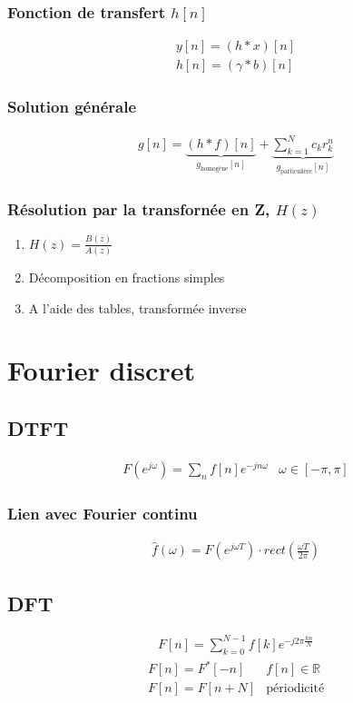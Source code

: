 \documentclass[a4paper]{amsart}
\begin{document}
\subsubsection{Fonction de transfert $h[n]$}
\begin{eqnarray}
	y[n]=(h*x)[n]\\
	h[n]=(\gamma*b)[n]
\end{eqnarray}
\subsubsection{Solution générale}
\begin{eqnarray}
	g[n]=\underbrace{(h*f)[n]}_{g_{\text{homogène}}[n]}+\underbrace{\sum_{k=1}^Nc_kr_k^n}_{g_{\text{particulière}}[n]}
\end{eqnarray}
\subsubsection{Résolution par la transfornée en Z, $H(z)$}
\begin{enumerate}
	\item $H(z)=\frac{B(z)}{A(z)}$
	\item Décomposition en fractions simples
	\item A l'aide des tables, transformée inverse
\end{enumerate}

\section{Fourier discret}
\subsection{DTFT}
\begin{eqnarray}
	F(e^{j\omega})=\sum_n f[n]e^{-jn\omega} & \omega \in [-\pi,\pi]
\end{eqnarray}
\subsubsection{Lien avec Fourier continu}
\begin{eqnarray}
	\hat f(\omega)=F(e^{j\omega T})\cdot rect(\frac{\omega T}{2\pi})
\end{eqnarray}

\subsection{DFT}
\begin{eqnarray}
	F[n]=\sum_{k=0}^{N-1}f[k]e^{-j2\pi\frac{kn}{N}}
\end{eqnarray}
\begin{eqnarray}
	F[n]=F^*[-n] & f[n]\in\mathbb R
	\\
	F[n]=F[n+N]& \text{périodicité}
\end{eqnarray}
\end{document}
